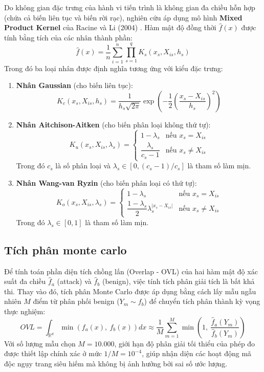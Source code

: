 ﻿\documentclass[../main.tex]{subfiles}
\begin{document}
Do không gian đặc trưng của hành vi tiến trình là không gian đa chiều hỗn hợp (chứa cả biến liên tục và biến rời rạc), nghiên cứu áp dụng mô hình \textbf{Mixed Product Kernel} của Racine và Li (2004) \cite{racine2004nonparametric}. Hàm mật độ đồng thời $\hat{f}(x)$ được tính bằng tích của các nhân thành phần:
\begin{equation}
    \hat{f}(x) = \frac{1}{n} \sum_{i=1}^{n} \prod_{s=1}^{q} K_s(x_s, X_{is}, h_s)
\end{equation}
Trong đó ba loại nhân được định nghĩa tương ứng với kiểu đặc trưng:
\begin{enumerate}
    \item \textbf{Nhân Gaussian} (cho biến liên tục):
    \begin{equation}
        K_c(x_s, X_{is}, h_s) = \frac{1}{h_s \sqrt{2\pi}} \exp\left( -\frac{1}{2} \left( \frac{x_s - X_{is}}{h_s} \right)^2 \right)
    \end{equation}
    \item \textbf{Nhân Aitchison-Aitken} (cho biến phân loại không thứ tự):
    \begin{equation}
        K_u(x_s, X_{is}, \lambda_s) = \begin{cases} 1 - \lambda_s & \text{nếu } x_s = X_{is} \\ \dfrac{\lambda_s}{c_s - 1} & \text{nếu } x_s \neq X_{is} \end{cases}
    \end{equation}
    Trong đó $c_s$ là số phân loại và $\lambda_s \in [0, (c_s - 1)/c_s]$ là tham số làm mịn.
    \item \textbf{Nhân Wang-van Ryzin} (cho biến phân loại có thứ tự):
    \begin{equation}
        K_o(x_s, X_{is}, \lambda_s) = \begin{cases} 1 - \lambda_s & \text{nếu } x_s = X_{is} \\ \dfrac{1 - \lambda_s}{2} \lambda_s^{|x_s - X_{is}|} & \text{nếu } x_s \neq X_{is} \end{cases}
    \end{equation}
    Trong đó $\lambda_s \in [0, 1]$ là tham số làm mịn.
\end{enumerate}

\subsection{Tích phân monte carlo}
Để tính toán phần diện tích chồng lấn (Overlap - OVL) của hai hàm mật độ xác suất đa chiều $\hat{f}_a$ (attack) và $\hat{f}_b$ (benign), việc tính tích phân giải tích là bất khả thi. Thay vào đó, tích phân Monte Carlo được áp dụng bằng cách lấy mẫu ngẫu nhiên $M$ điểm từ phân phối benign ($Y_m \sim f_b$) để chuyển tích phân thành kỳ vọng thực nghiệm:
\begin{equation}
    OVL = \int_{\mathbb{R}^d} \min\left( f_a(x),\ f_b(x) \right) dx \approx \frac{1}{M} \sum_{m=1}^{M} \min\left( 1,\ \frac{\hat{f}_a(Y_m)}{\hat{f}_b(Y_m)} \right)
\end{equation}
Với số lượng mẫu chọn $M=10.000$, giới hạn độ phân giải tối thiểu của phép đo được thiết lập chính xác ở mức $1/M = 10^{-4}$, giúp nhận diện các hoạt động mã độc ngụy trang siêu hiếm mà không bị ảnh hưởng bởi sai số ước lượng.
\end{document}
